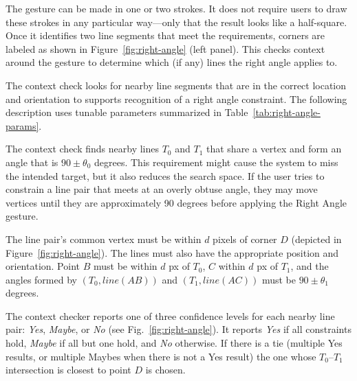 The gesture can be made in one or two strokes. It does not require
users to draw these strokes in any particular way---only that the
result looks like a half-square. Once it identifies two line segments
that meet the requirements, corners are labeled as shown in
Figure~\ref{fig:right-angle} (left panel). This checks context around
the gesture to determine which (if any) lines the right angle applies
to.

The context check looks for nearby line segments that are in the
correct location and orientation to supports recognition of a right
angle constraint.  The following description uses tunable parameters
summarized in Table~\ref{tab:right-angle-params}.

The context check finds nearby lines $T_0$ and $T_1$ that share a
vertex and form an angle that is $90\pm\theta_0$ degrees. This
requirement might cause the system to miss the intended target, but it
also reduces the search space. If the user tries to constrain a line
pair that meets at an overly obtuse angle, they may move vertices
until they are approximately 90 degrees before applying the Right
Angle gesture.

The line pair's common vertex must be within $d$ pixels of corner $D$
(depicted in Figure~\ref{fig:right-angle}). The lines must also have
the appropriate position and orientation. Point $B$ must be within $d$
px of $T_0$, $C$ within $d$ px of $T_1$, and the angles formed by
$(T_0, line(AB))$ and $(T_1, line(AC))$ must be $90\pm\theta_1$ degrees.




The context checker reports one of three confidence levels for each
nearby line pair: \textit{Yes}, \textit{Maybe}, or \textit{No} (see
Fig.~\ref{fig:right-angle}). It reports \textit{Yes} if all
constraints hold, \textit{Maybe} if all but one hold, and \textit{No}
otherwise. If there is a tie (multiple Yes results, or multiple Maybes
when there is not a Yes result) the one whose $T_0$--$T_1$
intersection is closest to point $D$ is chosen.

